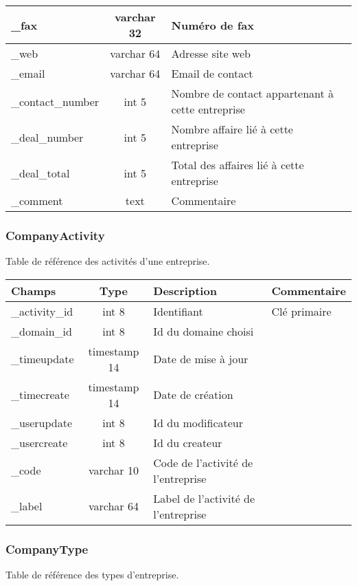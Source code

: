 \begin{tabular}{|p{3cm}|c|p{5.4cm}|p{2.6cm}|}
\hline
\_fax & varchar 32 & Numéro de fax & \\
\hline
\_web & varchar 64 & Adresse site web &\\
\hline
\_email & varchar 64  & Email de contact &\\
\hline
\_contact\_number & int 5 & Nombre de contact appartenant à cette entreprise &\\
\hline
\_deal\_number & int 5 & Nombre affaire lié à cette entreprise &\\
\hline
\_deal\_total & int 5 & Total des affaires lié à cette entreprise &\\
\hline
\_comment & text & Commentaire  &\\
\hline
\end{tabular}


\subsubsection{CompanyActivity}

Table de référence des activités d'une entreprise.\\

\begin{tabular}{|p{3cm}|c|p{5.4cm}|p{2.6cm}|}
\hline
\textbf{Champs} & \textbf{Type} & \textbf{Description} & \textbf{Commentaire} \\
\hline
\_activity\_id & int 8 & Identifiant & Clé primaire \\
\hline
\_domain\_id & int 8 & Id du domaine choisi & \\
\hline
\_timeupdate & timestamp 14 & Date de mise à jour & \\
\hline
\_timecreate & timestamp 14 & Date de création & \\
\hline
\_userupdate & int 8 & Id du modificateur & \\
\hline
\_usercreate & int 8 & Id du createur & \\
\hline
\_code & varchar 10 & Code de l'activité de l'entreprise & \\
\hline
\_label & varchar 64 & Label de l'activité de l'entreprise & \\
\hline
\end{tabular}


\subsubsection{CompanyType}

Table de référence des types d'entreprise.

